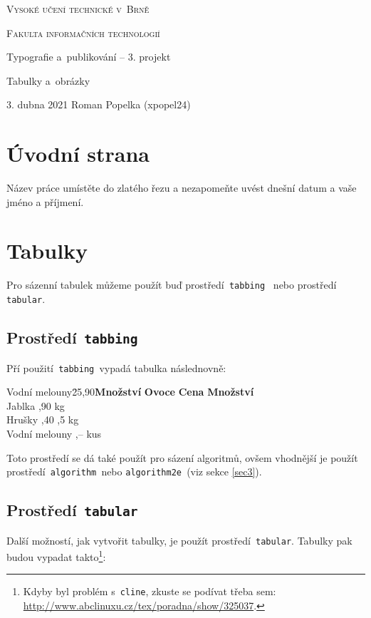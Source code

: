\documentclass[11pt]{article}
\begin{document}
     \begin{titlepage}
        \begin{center}
            \Huge
                \textsc{Vysoké učení technické v~Brně}
                
            \huge
                \textsc{Fakulta informačních technologií}
                
            \LARGE
                Typografie a~publikování -- 3. projekt
                
            \Huge
                \textmd{Tabulky a~obrázky}
                
        \end{center}
        {\Large 3. dubna 2021 \hfill Roman Popelka (xpopel24)}
    \end{titlepage}
\section{Úvodní strana}
Název práce umístěte do zlatého řezu a nezapomeňte uvést dnešní datum a vaše jméno a příjmení.
\section{Tabulky}
Pro sázenní tabulek můžeme použít buď prostředí\texttt{ tabbing } nebo prostředí\texttt{ tabular}.
\subsection{Prostředí\texttt{ tabbing}}
Pří použití\texttt{ tabbing }vypadá tabulka následnovně:
\begin{tabbing}
Vodní melouny\quad\=25,90\quad\=\textbf{Množství} \kill
\textbf{Ovoce} \> \textbf{Cena} \> \textbf{Množství} \\
Jablka         ,90     kg     \\
Hrušky         ,40    ,5 kg   \\
Vodní melouny  ,--     kus    \\
\end{tabbing}
Toto prostředí se dá také použít pro sázení algoritmů, ovšem vhodnější je použít prostředí\texttt{ algorithm }nebo \texttt{algorithm2e }(viz sekce \ref{sec3}).

\subsection{Prostředí\texttt{ tabular}}
Další možností, jak vytvořit tabulky, je použít prostředí\texttt{ tabular}. Tabulky pak budou vypadat takto\footnote{Kdyby byl problém s~\texttt{cline}, zkuste se podívat třeba sem: \url{ http://www.abclinuxu.cz/tex/poradna/show/325037}.\vfill}:
\end{document}
